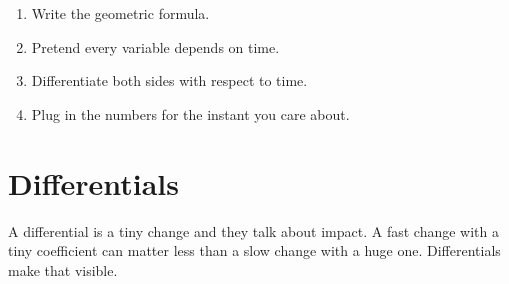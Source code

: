 \begin{enumerate}
\item Write the geometric formula.\\
\item Pretend every variable depends on time.\\
\item Differentiate both sides with respect to time.\\
\item Plug in the numbers for the instant you care about.\\
\end{enumerate}

\section{Differentials}
A differential is a tiny change and they talk about impact. A fast change with a tiny coefficient can matter less than a slow change with a huge one. Differentials make that visible.

